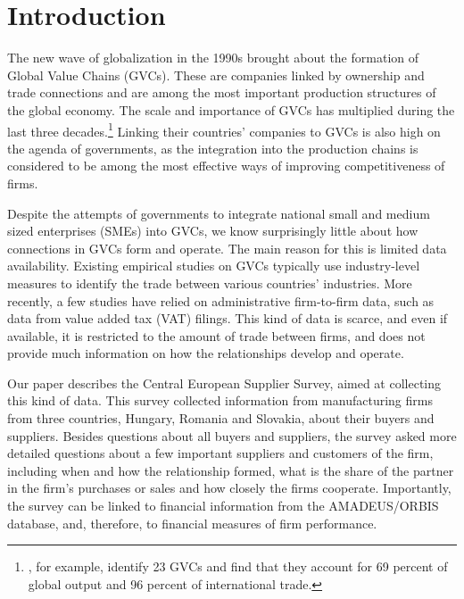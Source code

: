 \documentclass[final, dvipsnames, authoryear,12pt]{elsarticle}
\begin{document}

\section{Introduction}

The new wave of globalization in the 1990s brought about the formation of Global Value Chains (GVCs). These are companies linked by ownership and trade connections and are among the most important production structures of the global economy. The scale and importance of GVCs has multiplied during the last three decades.\footnote{\cite{mckinsey2019gvc}, for example, identify 23 GVCs and find that they account for 69 percent of global output and 96 percent of international trade.} Linking their countries' companies to GVCs is also high on the agenda of governments, as the integration into the production chains is considered to be among the most effective ways of improving competitiveness of firms.

Despite the attempts of governments to integrate national small and medium sized enterprises (SMEs) into GVCs, we know surprisingly little about how connections in GVCs form and operate. The main reason for this is limited data availability. Existing empirical studies on GVCs typically use industry-level measures to identify the trade between various countries' industries. More recently, a few studies have relied on administrative firm-to-firm data, such as data from value added tax (VAT) filings. This kind of data is scarce, and even if available, it is restricted to the amount of trade between firms, and does not provide much information on how the relationships develop and operate. 

Our paper describes the Central European Supplier Survey, aimed at collecting this kind of data. This survey collected information from manufacturing firms from three countries, Hungary, Romania and Slovakia, about their buyers and suppliers. Besides questions about all buyers and suppliers, the survey asked more detailed questions about a few important suppliers and customers of the firm, including when and how the relationship formed, what is the share of the partner in the firm's purchases or sales and how closely the firms cooperate. Importantly, the survey can be linked to financial information from the AMADEUS/ORBIS database, and, therefore, to financial measures of firm performance. 
\end{document}
